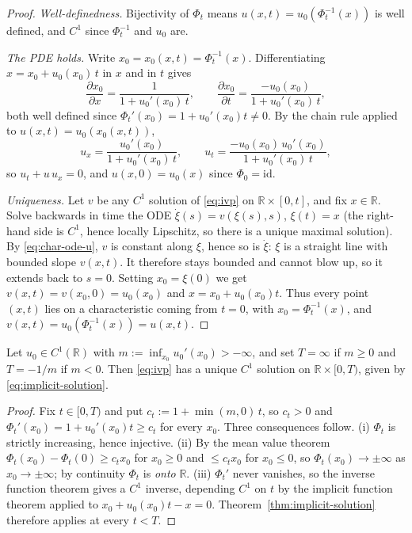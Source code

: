 \begin{proof}
\emph{Well-definedness.} Bijectivity of $\Phi_t$ means $u(x,t) =
u_0(\Phi_t^{-1}(x))$ is well defined, and $C^1$ since $\Phi_t^{-1}$ and
$u_0$ are.

\emph{The PDE holds.} Write $x_0 = x_0(x,t) = \Phi_t^{-1}(x)$.
Differentiating $x = x_0 + u_0(x_0)\, t$ in $x$ and in $t$ gives
\begin{equation}
  \frac{\partial x_0}{\partial x} = \frac{1}{1 + u_0'(x_0)\,t},
  \qquad
  \frac{\partial x_0}{\partial t} = \frac{-u_0(x_0)}{1 + u_0'(x_0)\, t},
\end{equation}
both well defined since $\Phi_t'(x_0) = 1+u_0'(x_0)t \neq 0$. By the chain
rule applied to $u(x,t) = u_0(x_0(x,t))$,
\begin{equation}
  u_x = \frac{u_0'(x_0)}{1 + u_0'(x_0)\,t},
  \qquad
  u_t = \frac{-u_0(x_0)\, u_0'(x_0)}{1 + u_0'(x_0)\, t},
\end{equation}
so $u_t + u\,u_x = 0$, and $u(x,0)=u_0(x)$ since $\Phi_0=\mathrm{id}$.

\emph{Uniqueness.} Let $v$ be any $C^1$ solution of \eqref{eq:ivp} on
$\mathbb{R}\times[0,t]$, and fix $x\in\mathbb{R}$. Solve backwards in time
the ODE $\dot\xi(s)=v(\xi(s),s)$, $\xi(t)=x$ (the right-hand side is $C^1$,
hence locally Lipschitz, so there is a unique maximal solution). By
\eqref{eq:char-ode-u}, $v$ is constant along $\xi$, hence so is $\dot\xi$:
$\xi$ is a straight line with bounded slope $v(x,t)$. It therefore stays
bounded and cannot blow up, so it extends back to $s=0$. Setting
$x_0=\xi(0)$ we get $v(x,t)=v(x_0,0)=u_0(x_0)$ and $x=x_0+u_0(x_0)t$.
Thus every point $(x,t)$ lies on a characteristic coming from $t=0$, with
$x_0=\Phi_t^{-1}(x)$, and $v(x,t)=u_0(\Phi_t^{-1}(x))=u(x,t)$.
\end{proof}

\begin{corollary}
\label{cor:local-existence}
Let $u_0 \in C^1(\mathbb{R})$ with $m := \inf_{x_0} u_0'(x_0) > -\infty$,
and set $T=\infty$ if $m\ge0$ and $T=-1/m$ if $m<0$. Then
\eqref{eq:ivp} has a unique $C^1$ solution on $\mathbb{R}\times[0,T)$,
given by \eqref{eq:implicit-solution}.
\end{corollary}

\begin{proof}
Fix $t\in[0,T)$ and put $c_t := 1+\min(m,0)\,t$, so $c_t>0$ and
$\Phi_t'(x_0)=1+u_0'(x_0)t\ge c_t$ for every $x_0$. Three consequences
follow. (i) $\Phi_t$ is strictly increasing, hence injective. (ii) By the
mean value theorem $\Phi_t(x_0)-\Phi_t(0)\ge c_t x_0$ for $x_0\ge0$ and
$\le c_t x_0$ for $x_0\le0$, so $\Phi_t(x_0)\to\pm\infty$ as
$x_0\to\pm\infty$; by continuity $\Phi_t$ is \emph{onto} $\mathbb{R}$.
(iii) $\Phi_t'$ never vanishes, so the inverse function theorem gives a
$C^1$ inverse, depending $C^1$ on $t$ by the implicit function theorem
applied to $x_0+u_0(x_0)t-x=0$. Theorem~\ref{thm:implicit-solution}
therefore applies at every $t<T$.
\end{proof}

